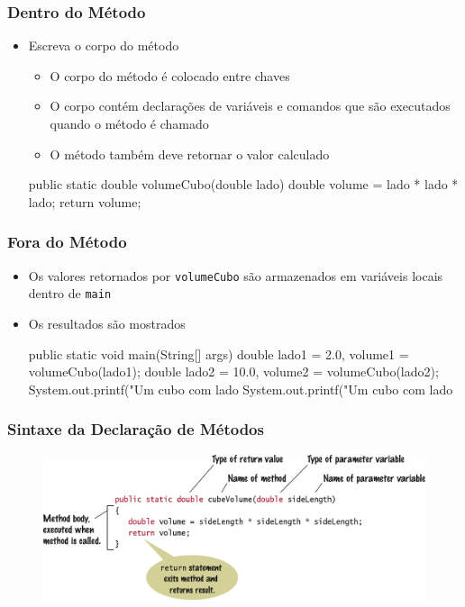 \documentclass[xcolor={dvipsnames,table},aspectratio=169]{beamer}
\begin{document}
\begin{frame}[fragile]\frametitle{Dentro do Método}
\begin{itemize}
	\item Escreva o corpo do método
	\begin{itemize}
		\item O corpo do método é colocado entre chaves
		\item O corpo contém declarações de variáveis e comandos que são executados quando o método é chamado
		\item O método também deve retornar o valor calculado
	\end{itemize}
\begin{javacode}
public static double volumeCubo(double lado) {
   double volume = lado * lado * lado;
   return volume;
}
\end{javacode}
\end{itemize}
\end{frame}

\begin{frame}[fragile]\frametitle{Fora do Método}
\begin{itemize}
	\item Os valores retornados por \texttt{volumeCubo} são armazenados em variáveis locais dentro de \texttt{main}
	\item Os resultados são mostrados
{\scriptsize
\begin{javacode}
public static void main(String[] args) {
   double lado1 = 2.0,  volume1 = volumeCubo(lado1);
   double lado2 = 10.0, volume2 = volumeCubo(lado2);
   System.out.printf("Um cubo com lado %
   System.out.printf("Um cubo com lado %
}
\end{javacode}
}
\end{itemize}
\end{frame}

\begin{frame}\frametitle{Sintaxe da Declaração de Métodos}
\begin{figure}[h]
	\includegraphics[height=0.65\paperheight,center]{pucrs-ep-fprog-unidade_05-metodos-laminas-sintaxe_metodos.png}
\end{figure}
\end{frame}
\end{document}
